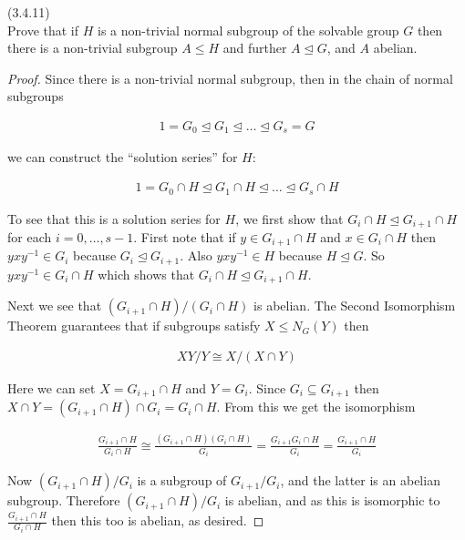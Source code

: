 \documentclass{exam}
\begin{document}
\begin{questions}
\question(3.4.11)\\
Prove that if $H$ is a non-trivial normal subgroup of the solvable group $G$ then there is a non-trivial subgroup $A\leq H$ and further $A\trianglelefteq G$, and $A$ abelian.

\begin{proof}
  Since there is a non-trivial normal subgroup, then in the chain of normal subgroups

  \begin{align*}
    1=G_0\trianglelefteq G_1 \trianglelefteq \dots \trianglelefteq G_s=G
  \end{align*}

  we can construct the ``solution series'' for $H$:

  \begin{align*}
    1=G_0\cap H \trianglelefteq G_1\cap H \trianglelefteq \dots \trianglelefteq G_s\cap H
  \end{align*}

  To see that this is a solution series for $H$, we first show that $G_i\cap H \trianglelefteq G_{i+1}\cap H$ for each $i=0,\dots,s-1$.  First note that if $y\in G_{i+1}\cap H$ and $x\in G_i\cap H$ then $yxy^{-1}\in G_i$ because $G_i\trianglelefteq G_{i+1}$.  Also $yxy^{-1}\in H$ because $H\trianglelefteq G$.  So $yxy^{-1}\in G_i\cap H$ which shows that $G_i\cap H\trianglelefteq G_{i+1}\cap H$.

  Next we see that $(G_{i+1}\cap H)/(G_i\cap H)$ is abelian.  The Second Isomorphism Theorem guarantees that if subgroups satisfy $X\leq N_G(Y)$ then

  \begin{align*}
    XY/Y \cong X/(X\cap Y)
  \end{align*}

  Here we can set $X = G_{i+1}\cap H$ and $Y = G_i$.  Since $G_i\subseteq G_{i+1}$ then $X\cap Y = (G_{i+1}\cap H)\cap G_i = G_i\cap H$.  From this we get the isomorphism

  \begin{align*}
    \frac{G_{i+1}\cap H}{G_i\cap H}\cong \frac{(G_{i+1}\cap H)(G_i\cap H)}{G_i} = \frac{G_{i+1}G_i\cap H}{G_i} = \frac{G_{i+1}\cap H}{G_i}
  \end{align*}

  Now $(G_{i+1}\cap H)/G_i$ is a subgroup of $G_{i+1}/G_i$, and the latter is an abelian subgroup.  Therefore $(G_{i+1}\cap H)/G_i$ is abelian, and as this is isomorphic to $\frac{G_{i+1}\cap H}{G_i\cap H}$ then this too is abelian, as desired.


\end{proof}
\end{questions}
\end{document}
